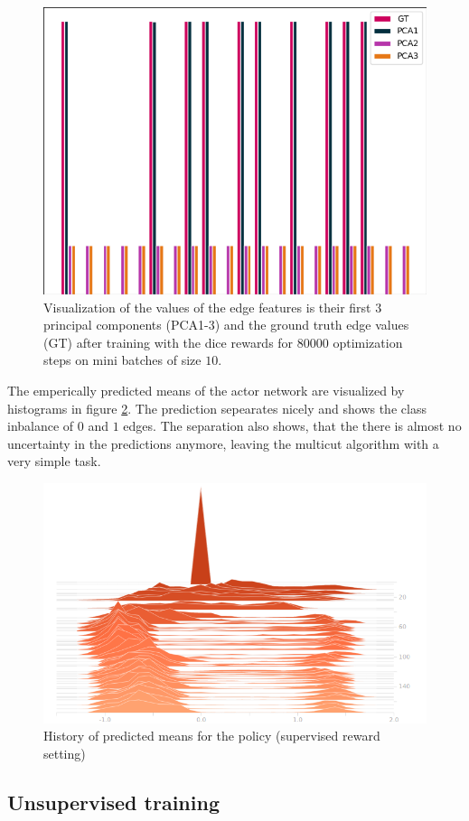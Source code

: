 \begin{figure}[ht!]
	\centering
	\includegraphics[width=.5\textwidth]{figures/plots/edge_embeddings.png}
	\caption{Visualization of the values of the edge features is their first $3$ principal components (PCA1-3) and the ground truth edge values (GT) after training with the dice rewards for $80000$ optimization steps on mini batches of size $10$.}
	\label{fig:res_edge_embed}
\end{figure}

The emperically predicted means of the actor network are visualized by histograms in figure \ref{fig:pred_means}. The prediction sepearates nicely and shows the class inbalance of $0$ and $1$ edges. The separation also shows, that the there is almost no uncertainty in the predictions anymore, leaving the multicut algorithm with a very simple task.

\begin{figure}[ht!]
	\centering
	\includegraphics[width=.7\textwidth]{figures/plots/logit_means_hist.png}
	\caption{History of predicted means for the policy (supervised reward setting)}
	\label{fig:pred_means}
\end{figure}

\subsection{Unsupervised training}

